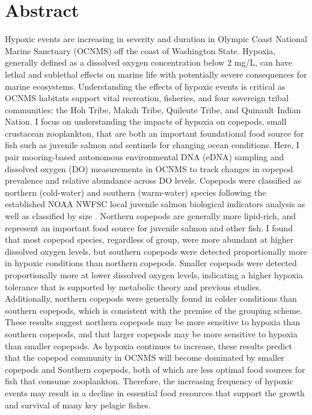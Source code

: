 \documentclass[12pt,twoside]{reedthesis}
\begin{document}
    \chapter*{Abstract}
Hypoxic events are increasing in severity and duration in Olympic Coast National Marine Sanctuary (OCNMS) off the coast of Washington State. Hypoxia, generally defined as a dissolved oxygen concentration below 2 mg/L, can have lethal and sublethal effects on marine life with potentially severe consequences for marine ecosystems. Understanding the effects of hypoxic events is critical as OCNMS habitats support vital recreation, fisheries, and four sovereign tribal communities: the Hoh Tribe, Makah Tribe, Quileute Tribe, and Quinault Indian Nation. I focus on understanding the impacts of hypoxia on copepods, small crustacean zooplankton, that are both an important foundational food source for fish such as juvenile salmon and sentinels for changing ocean conditions. Here, I pair mooring-based autonomous environmental DNA (eDNA) sampling and dissolved oxygen (DO) measurements in OCNMS to track changes in copepod prevalence and relative abundance across DO levels. Copepods were classified as northern (cold-water) and southern (warm-water) species following the established NOAA NWFSC local juvenile salmon biological indicators analysis as well as classified by size \autocite{NOAAFisheries2024}. Northern copepods are generally more lipid-rich, and represent an important food source for juvenile salmon and other fish. I found that most copepod species, regardless of group, were more abundant at higher dissolved oxygen levels, but southern copepods were detected proportionally more in hypoxic conditions than northern copepods. Smaller copepods were detected proportionally more at lower dissolved oxygen levels, indicating a higher hypoxia tolerance that is supported by metabolic theory and previous studies. Additionally, northern copepods were generally found in colder conditions than southern copepods, which is consistent with the premise of the grouping scheme. These results suggest northern copepods may be more sensitive to hypoxia than southern copepods, and that larger copepods may be more sensitive to hypoxia than smaller copepods. As hypoxia continues to increase, these results predict that the copepod community in OCNMS will become dominated by smaller copepods and Southern copepods, both of which are less optimal food sources for fish that consume zooplankton. Therefore, the increasing frequency of hypoxic events may result in a decline in essential food resources that support the growth and survival of many key pelagic fishes.
	
\end{document}
